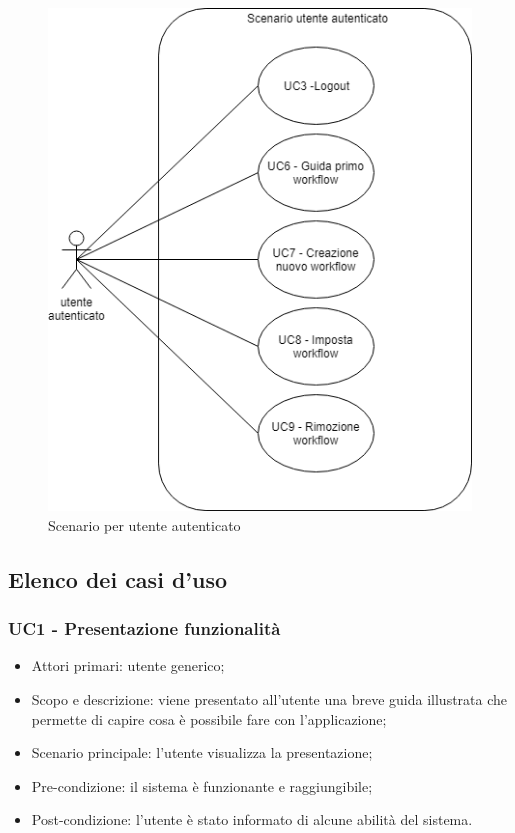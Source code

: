 \begin{figure}[H]
	\centering
	\includegraphics[width=15cm,keepaspectratio]{../includes/pics/scenario_autenticato.png}
	\caption{\label{fig:mission}Scenario per utente autenticato}
\end{figure}


\subsection{Elenco dei casi d'uso}
\label{sec:elenco_uc}


\subsubsection{UC1 - Presentazione funzionalità}
\begin{itemize}
	\item  Attori primari: utente generico;
	\item  Scopo e descrizione: viene presentato all'utente una breve guida illustrata che permette di capire cosa è possibile fare con l'applicazione;
	\item  Scenario principale: l'utente visualizza la presentazione;
	\item  Pre-condizione: il sistema è funzionante e raggiungibile;
	\item  Post-condizione: l'utente è stato informato di alcune abilità del sistema.
\end{itemize}

